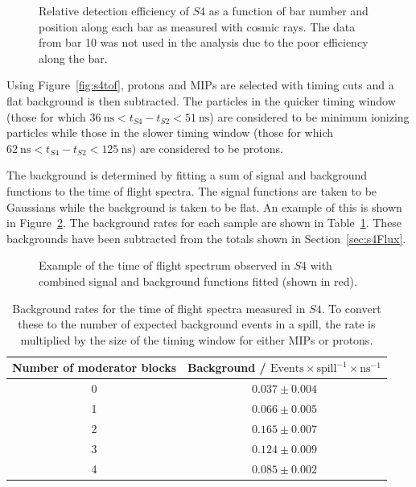 \begin{figure}
  \begin{adjustbox}{width=.68\textwidth, center}
    
  \end{adjustbox}
  \caption{Relative detection efficiency of $\mathit{S4}$ as a function of bar number and position along each bar as measured with cosmic rays. The data from bar 10 was not used in the analysis due to the poor efficiency along the bar.}
  \label{fig:s4PosEff}
\end{figure}

Using Figure~\ref{fig:s4tof}, protons and MIPs are selected with timing cuts and a flat background is then subtracted.
The particles in the quicker timing window (those for which $36~\text{ns}<t_{\mathit{S4}}-t_{\mathit{S2}}<51~\text{ns}$) are considered to be minimum ionizing particles while those in the slower timing window (those for which $62~\text{ns}<t_{\mathit{S4}}-t_{\mathit{S2}}<125~\text{ns}$) are considered to be protons.

The background is determined by fitting a sum of signal and background functions to the time of flight spectra.
The signal functions are taken to be Gaussians while the background is taken to be flat. 
An example of this is shown in Figure~\ref{fig:fitEx}.
The background rates for each sample are shown in Table~\ref{tab:backgrounds}.
These backgrounds have been subtracted from the totals shown in Section~\ref{sec:s4Flux}.

\begin{figure}[h]
  \begin{adjustbox}{max totalsize={.8\textwidth}{.62\textheight},center}
    
  \end{adjustbox}
  \caption{Example of the time of flight spectrum observed in $\mathit{S4}$ with combined signal and background functions fitted (shown in red).}
  \label{fig:fitEx}
\end{figure}

\begin{table}
  \centering
  \caption{Background rates for the time of flight spectra measured in $\mathit{S4}$. To convert these to the number of expected background events in a spill, the rate is multiplied by the size of the timing window for either MIPs or protons.}
  \begin{tabular}{c|c}
    \hline
    \hline
    Number of moderator blocks & Background / $\text{Events} \times \text{spill}^{-1} \times \text{ns}^{-1}$ \\
    \hline
    0 & $0.037 \pm 0.004$ \\
    1 & $0.066 \pm 0.005$ \\
    2 & $0.165 \pm 0.007$ \\
    3 & $0.124 \pm 0.009$ \\
    4 & $0.085 \pm 0.002$ \\
    \hline
  \end{tabular}
  \label{tab:backgrounds}
\end{table}


